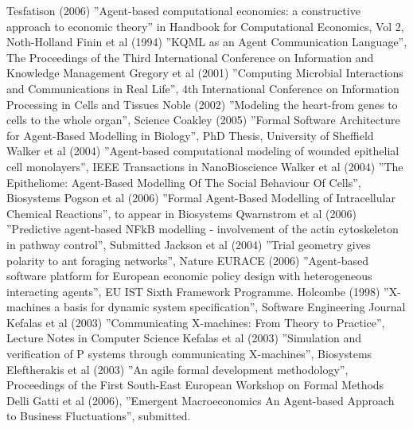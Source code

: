 
\begin{thebibliography}{99}
 Tesfatison (2006) ''Agent-based computational economics: a constructive approach to economic theory'' in Handbook for Computational Economics, Vol 2, Noth-Holland
 Finin et al (1994) ''KQML as an Agent Communication Language'', The Proceedings of  the Third International Conference on Information and Knowledge Management
 Gregory et al (2001)  ''Computing Microbial Interactions and Communications in Real Life'', 4th International Conference on Information Processing in Cells and Tissues
 Noble (2002)  ''Modeling the heart-from genes to cells to the whole organ'', Science
 Coakley  (2005) ''Formal Software Architecture for Agent-Based Modelling in Biology'', PhD Thesis, University of Sheffield
 Walker et al (2004) ''Agent-based computational modeling of wounded epithelial cell monolayers'', IEEE Transactions in NanoBioscience
 Walker et al (2004) ''The Epitheliome: Agent-Based Modelling Of The Social Behaviour Of Cells'', Biosystems
 Pogson  et al (2006) ''Formal Agent-Based Modelling of Intracellular Chemical Reactions'', to appear in Biosystems
 Qwarnstrom et al (2006) ''Predictive agent-based NFkB modelling - involvement of the actin cytoskeleton in pathway control'', Submitted
 Jackson et al (2004) ''Trial geometry gives polarity to ant foraging networks'', Nature
 EURACE (2006)  ''Agent-based software platform for European economic policy design with heterogeneous interacting agents'', EU IST Sixth Framework Programme.
 Holcombe (1998) ''X-machines a basis for dynamic system specification'', Software Engineering Journal
 Kefalas et al (2003) ''Communicating X-machines: From Theory to Practice'', Lecture Notes in Computer Science
 Kefalas et al (2003) ''Simulation and verification of P systems through communicating X-machines'', Biosystems
 Eleftherakis et al (2003) ''An agile formal development methodology'', Proceedings of the First South-East European Workshop on Formal Methods
 Delli Gatti et al (2006), ''Emergent Macroeconomics An Agent-based Approach to Business Fluctuations'', submitted.
\end{thebibliography}